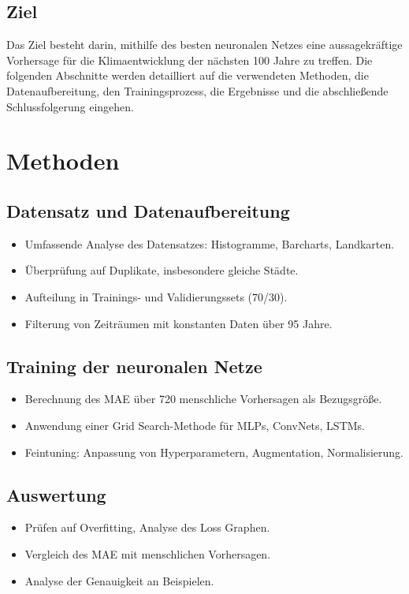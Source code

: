 \documentclass[manuscript,screen,review]{acmart}
\begin{document}
\subsection{Ziel}
Das Ziel besteht darin, mithilfe des besten neuronalen Netzes eine aussagekräftige Vorhersage für die Klimaentwicklung der nächsten 100 Jahre zu treffen.
Die folgenden Abschnitte werden detailliert auf die verwendeten Methoden, die Datenaufbereitung, den Trainingsprozess, die Ergebnisse und die abschließende Schlussfolgerung eingehen.

\section{Methoden}

\subsection*{Datensatz und Datenaufbereitung}
\begin{itemize}
    \item Umfassende Analyse des Datensatzes: Histogramme, Barcharts, Landkarten.
    \item Überprüfung auf Duplikate, insbesondere gleiche Städte.
    \item Aufteilung in Trainings- und Validierungssets (70/30).
    \item Filterung von Zeiträumen mit konstanten Daten über 95 Jahre.
\end{itemize}

\subsection*{Training der neuronalen Netze}
\begin{itemize}
    \item Berechnung des MAE über 720 menschliche Vorhersagen als Bezugsgröße.
    \item Anwendung einer Grid Search-Methode für MLPs, ConvNets, LSTMs.
    \item Feintuning: Anpassung von Hyperparametern, Augmentation, Normalisierung.
\end{itemize}

\subsection*{Auswertung}
\begin{itemize}
    \item Prüfen auf Overfitting, Analyse des Loss Graphen.
    \item Vergleich des MAE mit menschlichen Vorhersagen.
    \item Analyse der Genauigkeit an Beispielen.
\end{itemize}
\end{document}
